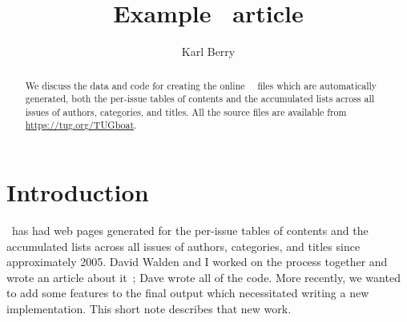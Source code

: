 \documentclass{ltugboat}
\title{Example \TUB\ article}
\author{Karl Berry}
\begin{document}
\maketitle

\begin{abstract}
We discuss the data and code for creating the online \TUB\ \HTML\ files
which are automatically generated, both the per-issue tables of contents
and the accumulated lists across all issues of authors, categories, and
titles. All the source files are available from
\url{https://tug.org/TUGboat}.
\end{abstract}

\section{Introduction}

\TUB\ has had web pages generated for the per-issue tables of contents
and the accumulated lists across all issues of authors, categories, and
titles since approximately 2005. David Walden and I worked on the
process together and wrote an article about it~\cite{Berry:TB32-1-23};
Dave wrote all of the code. More recently, we wanted to add some
features to the final output which necessitated writing a new
implementation. This short note describes that new work.




\makesignature
\end{document}
